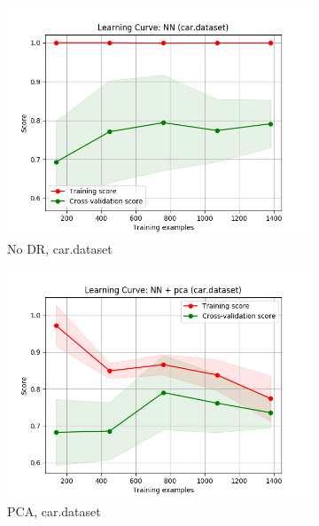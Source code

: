\documentclass{article}
\begin{document}
    \begin{figure}[htb]
    \centering

      \begin{subfigure}{0.33\textwidth}
        \includegraphics[width=\linewidth]{out/nn_dr/car-learning.png}
        \caption{No DR, car.dataset}
      \end{subfigure}\hfil
      \begin{subfigure}{0.33\textwidth}
        \includegraphics[width=\linewidth]{out/nn_dr/car-pca-learning.png}
        \caption{PCA, car.dataset}
      \end{subfigure}\hfil
      \begin{subfigure}{0.33\textwidth}

\end{subfigure}
\end{figure}
\end{document}
